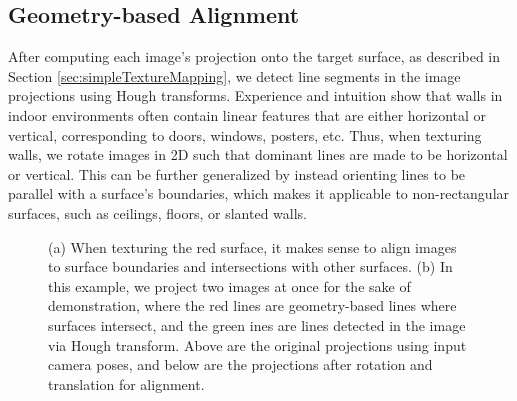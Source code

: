 \documentclass[]{spie}  %
\begin{document}
\subsection{Geometry-based Alignment}
\label{sec:geometryAlignment}
After computing each image's projection onto the target surface, as
described in Section \ref{sec:simpleTextureMapping}, we detect line
segments in the image projections using Hough transforms. Experience
and intuition show that walls in indoor environments often contain
linear features that are either horizontal or vertical, corresponding
to doors, windows, posters, etc. Thus, when texturing walls, we rotate
images in 2D such that dominant lines are made to be horizontal or
vertical. This can be further generalized by instead orienting lines
to be parallel with a surface's boundaries, which makes it applicable
to non-rectangular surfaces, such as ceilings, floors, or slanted
walls.

\begin{figure}
  \centering
  \caption{(a) When texturing the red surface, it makes sense to align
    images to surface boundaries and intersections with other
    surfaces. (b) In this example, we project two images at once for
    the sake of demonstration, where the red lines are geometry-based
    lines where surfaces intersect, and the green ines are lines
    detected in the image via Hough transform. Above are the original
    projections using input camera poses, and below are the
    projections after rotation and translation for alignment.}
  \label{fig:geometryAlignment}
\end{figure}
\end{document}
